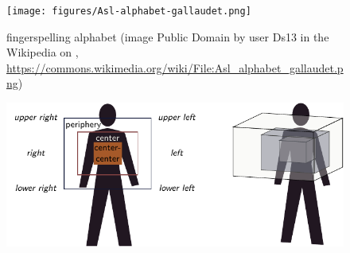 \documentclass[output=paper,biblatex,babelshorthands,newtxmath,draftmode,colorlinks,citecolor=brown]{langscibook}
\begin{document}
\begin{figure}[tb]
  \centering
  \texttt{[image: figures/Asl-alphabet-gallaudet.png]}
  \caption[ASL fingerspelling]{ fingerspelling alphabet (image %
Public Domain by user Ds13 in the  Wikipedia on , \url{https://commons.wikimedia.org/wiki/File:Asl_alphabet_gallaudet.png})}
  \label{fig:asl}
\end{figure}

\begin{figure}[tb]
  \centering
\includegraphics[width=.95\linewidth]{figures/gesture-fig-gesture-space}

\end{figure}
\end{document}
